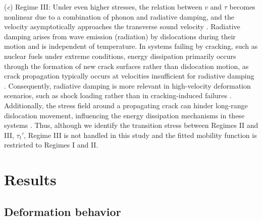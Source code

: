 \documentclass[applsci,article,submit,pdftex,moreauthors]{Definitions/mdpi}
\newcommand{\?}{\stackrel{?}{=}}
\begin{document}
(\textit{c}) Regime III: Under even higher stresses, the relation between $v$ and $\tau$ becomes nonlinear due to a combination of phonon and radiative damping, and the velocity asymptotically approaches the transverse sound velocity \cite{Dang2019}. Radiative damping arises from wave emission (radiation) by dislocations during their motion and is independent of temperature. In systems failing by cracking, such as nuclear fuels under extreme conditions, energy dissipation primarily occurs through the formation of new crack surfaces rather than dislocation motion, as crack propagation typically occurs at velocities insufficient for radiative damping \cite{Kresse2004}. Consequently, radiative damping is more relevant in high-velocity deformation scenarios, such as shock loading rather than in cracking-induced failures \cite{Kresse2004}. Additionally, the stress field around a propagating crack can hinder long-range dislocation movement, influencing the energy dissipation mechanisms in these systems \cite{Kresse2004}. Thus, although we identify the transition stress between Regimes II and III, $\tau_t'$, Regime III is not handled in this study and the fitted mobility function is restricted to Regimes I and II.


\section{Results}

\subsection{Deformation behavior}
\label{Sec:SS}
\end{document}
